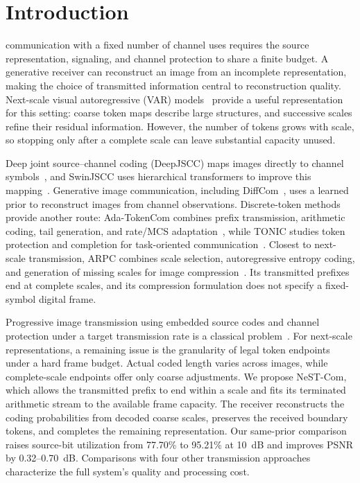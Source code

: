 \section{Introduction}
 communication with a fixed number of channel uses requires the source representation, signaling, and channel protection to share a finite budget. A generative receiver can reconstruct an image from an incomplete representation, making the choice of transmitted information central to reconstruction quality. Next-scale visual autoregressive (VAR) models~\cite{var} provide a useful representation for this setting: coarse token maps describe large structures, and successive scales refine their residual information. However, the number of tokens grows with scale, so stopping only after a complete scale can leave substantial capacity unused.

Deep joint source--channel coding (DeepJSCC) maps images directly to channel symbols~\cite{deepjscc}, and SwinJSCC uses hierarchical transformers to improve this mapping~\cite{swinjscc}. Generative image communication, including DiffCom~\cite{diffcom}, uses a learned prior to reconstruct images from channel observations. Discrete-token methods provide another route: Ada-TokenCom combines prefix transmission, arithmetic coding, tail generation, and rate/MCS adaptation~\cite{adatokencom}, while TONIC studies token protection and completion for task-oriented communication~\cite{tonic}. Closest to next-scale transmission, ARPC combines scale selection, autoregressive entropy coding, and generation of missing scales for image compression~\cite{arpc}. Its transmitted prefixes end at complete scales, and its compression formulation does not specify a fixed-symbol digital frame.

Progressive image transmission using embedded source codes and channel protection under a target transmission rate is a classical problem~\cite{chande}. For next-scale representations, a remaining issue is the granularity of legal token endpoints under a hard frame budget. Actual coded length varies across images, while complete-scale endpoints offer only coarse adjustments. We propose NeST-Com, which allows the transmitted prefix to end within a scale and fits its terminated arithmetic stream to the available frame capacity. The receiver reconstructs the coding probabilities from decoded coarse scales, preserves the received boundary tokens, and completes the remaining representation. Our same-prior comparison raises source-bit utilization from 77.70\% to 95.21\% at 10~dB and improves PSNR by 0.32--0.70~dB. Comparisons with four other transmission approaches characterize the full system's quality and processing cost.
